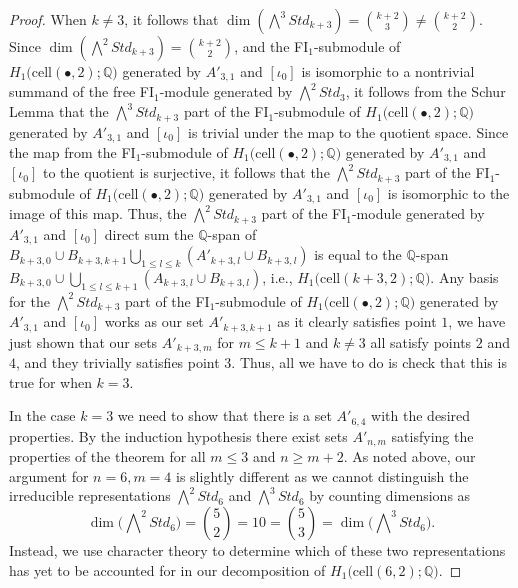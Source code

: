 \documentclass[12py]{amsart}%
\theoremstyle{definition}\newtheorem{definition}[thm]{Definition}
\theoremstyle{definition}
\newcommand{\Q}{\ensuremath{\mathbb{Q}}}
\begin{document}
\begin{proof}
When $k\neq 3$, it follows that $\dim(\bigwedge^{3}Std_{k+3})=\binom{k+2}{3}\neq\binom{k+2}{2}$. 
Since $\dim(\bigwedge^{2}Std_{k+3})=\binom{k+2}{2}$, and the FI$_{1}$-submodule of $H_{1}\big(\text{cell}(\bullet,2);\Q\big)$ generated by $A'_{3,1}$ and $[\iota_{0}]$ is isomorphic to a nontrivial summand of the free FI$_{1}$-module generated by $\bigwedge^{2}Std_{3}$, it follows from the Schur Lemma that the $\bigwedge^{3}Std_{k+3}$ part of the FI$_{1}$-submodule of $H_{1}\big(\text{cell}(\bullet,2);\Q\big)$ generated by $A'_{3,1}$ and $[\iota_{0}]$ is trivial under the map to the quotient space. 
Since the map from the FI$_{1}$-submodule of $H_{1}\big(\text{cell}(\bullet,2);\Q\big)$ generated by $A'_{3,1}$ and $[\iota_{0}]$ to the quotient is surjective, it follows that the $\bigwedge^{2}Std_{k+3}$ part of the FI$_{1}$-submodule of $H_{1}\big(\text{cell}(\bullet,2);\Q\big)$ generated by $A'_{3,1}$ and $[\iota_{0}]$ is isomorphic to the image of this map. 
Thus, the $\bigwedge^{2}Std_{k+3}$ part of the FI$_{1}$-module generated by $A'_{3,1}$ and $[\iota_{0}]$ direct sum the $\Q$-span of $B_{k+3,0}\cup B_{k+3,k+1}\bigcup_{1\le l\le k}(A'_{k+3,l}\cup B_{k+3,l})$ is equal to the $\Q$-span $B_{k+3,0}\cup\bigcup_{1\le l\le k+1}(A_{k+3,l}\cup B_{k+3,l})$, i.e., $H_{1}\big(\text{cell}(k+3,2);\Q\big)$. 
Any basis for the $\bigwedge^{2}Std_{k+3}$ part of the FI$_{1}$-submodule of $H_{1}\big(\text{cell}(\bullet,2);\Q\big)$ generated by $A'_{3,1}$ and $[\iota_{0}]$ works as our set $A'_{k+3,k+1}$ as it clearly satisfies point $1$, we have just shown that our sets $A'_{k+3, m}$ for $m\le k+1$ and $k\neq 3$ all satisfy points $2$ and $4$, and they trivially satisfies point $3$. 
Thus, all we have to do is check that this is true for when $k=3$.

In the case $k=3$ we need to show that there is a set $A'_{6,4}$ with the desired properties. By the induction hypothesis there exist sets $A'_{n,m}$ satisfying the properties of the theorem for all $m\le 3$ and $n\ge m+2$. As noted above, our argument for $n=6, m=4$ is slightly different as we cannot distinguish the irreducible representations $\bigwedge^{2}Std_{6}$ and $\bigwedge^{3}Std_{6}$ by counting dimensions as 
\[
\dim\Big(\bigwedge\nolimits^{2}Std_{6}\Big)=\binom{5}{2}=10=\binom{5}{3}=\dim\Big(\bigwedge\nolimits^{3}Std_{6}\Big).
\]
Instead, we use character theory to determine which of these two representations has yet to be accounted for in our decomposition of $H_{1}\big(\text{cell}(6,2);\Q\big)$.





\end{proof}
\end{document}
